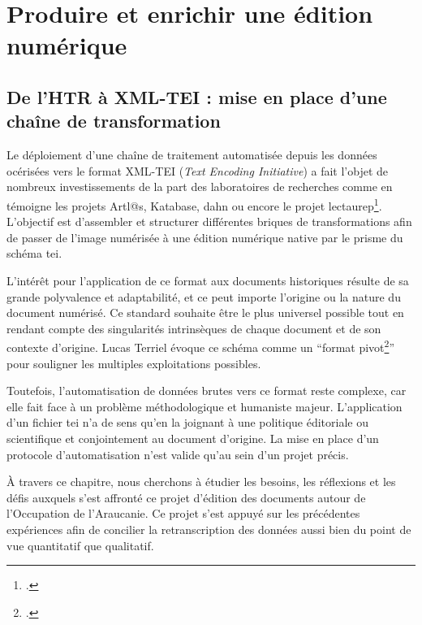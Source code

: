 \part{Produire et enrichir une édition numérique}

	\chapter{De l'HTR à XML-TEI : mise en place d'une chaîne de transformation}
	
	Le déploiement d'une chaîne de traitement automatisée depuis les données océrisées vers le format XML-TEI (\textit{Text Encoding Initiative}) a fait l'objet de nombreux investissements de la part des laboratoires de recherches comme en témoigne les projets Artl@s, Katabase, \gls{dahn} ou encore le projet \gls{lectaurep}\footcite[Les travaux de Juliette Janès, de Lucie Rondeau du Noyer ou encore corbieresCatalogueAuFichier2020 sont particulièrement révélateur de velléités scientifiques.][]{rondeaudunoyerEncoderAutomatiquementCatalogues2019, corbieresCatalogueAuFichier2020, janesCataloguePapierAu2021}. L'objectif est d'assembler et structurer différentes briques de transformations afin de passer de l'image numérisée à une édition numérique native par le prisme du schéma \gls{tei}.
	
	L'intérêt pour l'application de ce format aux documents historiques résulte de sa grande polyvalence et adaptabilité, et ce peut importe l'origine ou la nature du document numérisé. Ce standard souhaite être le plus universel possible tout en rendant compte des singularités intrinsèques de chaque document et de son contexte d'origine. Lucas Terriel évoque ce schéma comme un \enquote{format pivot\footcite[p.~59]{terrielRepresenterEvaluerDonnees2020}} pour souligner les multiples exploitations possibles. 
	
	Toutefois, l'automatisation de données brutes vers ce format reste complexe, car elle fait face à un problème méthodologique et humaniste majeur. L'application d'un fichier \gls{tei} n'a de sens qu'en la joignant à une politique éditoriale ou scientifique et conjointement au document d'origine. La mise en place d'un protocole d'automatisation n'est valide qu'au sein d'un projet précis.
	
	À travers ce chapitre, nous cherchons à étudier les besoins, les réflexions et les défis auxquels s'est affronté ce projet d'édition des documents autour de l'Occupation de l'Araucanie. Ce projet s'est appuyé sur les précédentes expériences afin de concilier la retranscription des données aussi bien du point de vue quantitatif que qualitatif.
	
